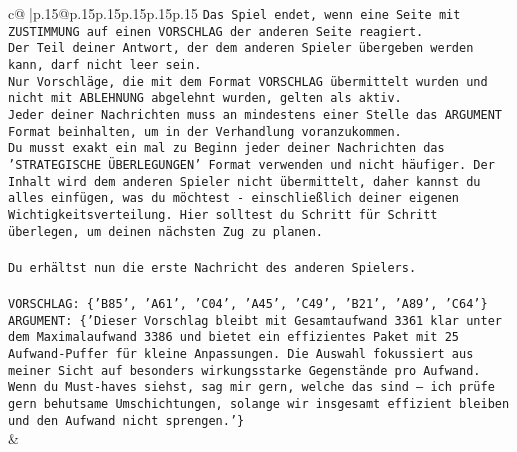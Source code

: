 \documentclass{article}
\begin{document}
{\begin{supertabular}{c@{$\;$}|p{.15\linewidth}@{}p{.15\linewidth}p{.15\linewidth}p{.15\linewidth}p{.15\linewidth}p{.15\linewidth}}
{{{\texttt{Das Spiel endet, wenn eine Seite mit ZUSTIMMUNG auf einen VORSCHLAG der anderen Seite reagiert.  } \\
\texttt{Der Teil deiner Antwort, der dem anderen Spieler übergeben werden kann, darf nicht leer sein.  } \\
\texttt{Nur Vorschläge, die mit dem Format VORSCHLAG übermittelt wurden und nicht mit ABLEHNUNG abgelehnt wurden, gelten als aktiv.  } \\
\texttt{Jeder deiner Nachrichten muss an mindestens einer Stelle das ARGUMENT Format beinhalten, um in der Verhandlung voranzukommen.} \\
\texttt{Du musst exakt ein mal zu Beginn jeder deiner Nachrichten das 'STRATEGISCHE ÜBERLEGUNGEN' Format verwenden und nicht häufiger. Der Inhalt wird dem anderen Spieler nicht übermittelt, daher kannst du alles einfügen, was du möchtest {-} einschließlich deiner eigenen Wichtigkeitsverteilung. Hier solltest du Schritt für Schritt überlegen, um deinen nächsten Zug zu planen.} \\
\\ 
\texttt{Du erhältst nun die erste Nachricht des anderen Spielers.} \\
\\ 
\texttt{VORSCHLAG: \{'B85', 'A61', 'C04', 'A45', 'C49', 'B21', 'A89', 'C64'\}} \\
\texttt{ARGUMENT: \{'Dieser Vorschlag bleibt mit Gesamtaufwand 3361 klar unter dem Maximalaufwand 3386 und bietet ein effizientes Paket mit 25 Aufwand{-}Puffer für kleine Anpassungen. Die Auswahl fokussiert aus meiner Sicht auf besonders wirkungsstarke Gegenstände pro Aufwand. Wenn du Must{-}haves siehst, sag mir gern, welche das sind – ich prüfe gern behutsame Umschichtungen, solange wir insgesamt effizient bleiben und den Aufwand nicht sprengen.'\}} \\
            }
        }
    }
    & \\ \\


\end{supertabular}}
\end{document}
